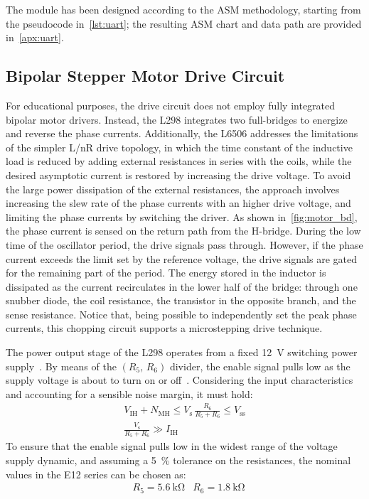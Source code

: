 \documentclass[]{article}
\begin{document}
The module has been designed according to the ASM methodology, starting from the pseudocode in~\cref{lst:uart}; the resulting ASM chart and data path are provided in~\cref{apx:uart}.
 
\subsection{Bipolar Stepper Motor Drive Circuit}\label{subsec:motor_bd}

For educational purposes, the drive circuit does not employ fully integrated bipolar motor drivers. Instead, the L298 integrates two full-bridges to energize and reverse the phase currents. Additionally, the L6506 addresses the limitations of the simpler L/nR drive topology, in which the time constant of the inductive load is reduced by adding external resistances in series with the coils, while the desired asymptotic current is restored by increasing the drive voltage. To avoid the large power dissipation of the external resistances, the approach involves increasing the slew rate of the phase currents with an higher drive voltage, and limiting the phase currents by switching the driver. As shown in~\cref{fig:motor_bd}, the phase current is sensed on the return path from the H-bridge. During the low time of the oscillator period, the drive signals pass through. However, if the phase current exceeds the limit set by the reference voltage, the drive signals are gated for the remaining part of the period. The energy stored in the inductor is dissipated as the current recirculates in the lower half of the bridge: through one snubber diode, the coil resistance, the transistor in the opposite branch, and the sense resistance. Notice that, being possible to independently set the peak phase currents, this chopping circuit supports a microstepping drive technique.

The power output stage of the L298 operates from a fixed \qty{12}{\V} switching power supply~\cite{pwr}. By means of the $(R_5,\,R_6)$ divider, the enable signal pulls low as the supply voltage is about to turn on or off~\cite[9]{l298}. Considering the input characteristics and accounting for a sensible noise margin, it must hold:
\begin{gather*}
    V_\text{IH}+N_\text{MH} \leq V_\text{s}\,\frac{R_6}{R_5+R_6} \leq V_\text{ss} \\
    \frac{V_\text{s}}{R_5+R_6} \gg I_\text{IH}
\end{gather*}
To ensure that the enable signal pulls low in the widest range of the voltage supply dynamic, and assuming a \qty{5}{\percent} tolerance on the resistances, the nominal values in the E12 series can be chosen as:
\begin{align*}
&R_5 = \qty{5.6}{\kohm} &R_6 = \qty{1.8}{\kohm}
\end{align*}
\end{document}
